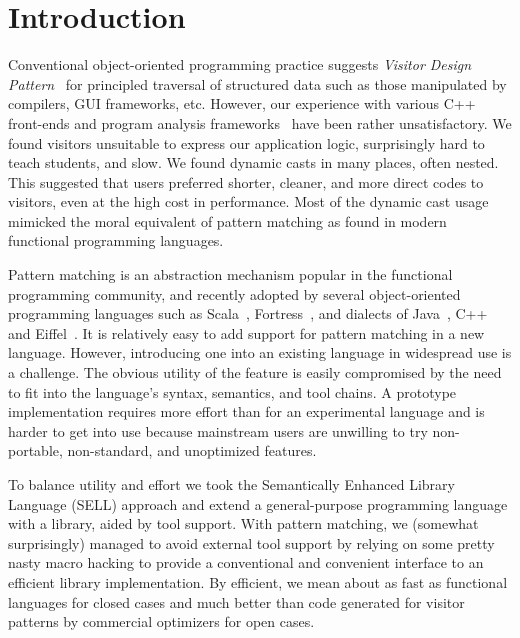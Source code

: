 \documentclass{llncs}
\begin{document}
\section{Introduction} %
\label{sec:intro}

Conventional object-oriented programming practice suggests \emph{Visitor Design 
Pattern}~\cite{DesignPatterns} for principled traversal of structured data such 
as those manipulated by compilers, GUI frameworks, etc. However, our experience 
with various C++ front-ends and program analysis frameworks~\cite{Pivot09,Phoenix,Clang} 
have been rather unsatisfactory. We found visitors unsuitable to express our 
application logic, surprisingly hard to teach students, and slow. We found 
dynamic casts in many places, often nested. This suggested that users preferred 
shorter, cleaner, and more direct codes to visitors, even at the high cost in 
performance. Most of the dynamic cast usage mimicked the moral equivalent of 
pattern matching as found in modern functional programming languages.

Pattern matching is an abstraction mechanism popular in the functional
programming community, and recently adopted by several object-oriented
programming languages such as Scala~\cite{Scala2nd}, Fortress~\cite{RPS10},
and dialects of Java~\cite{Odersky97pizzainto,Liu03jmatch:iterable,HydroJ2003}, 
C++\cite{Prop96} and Eiffel~\cite{Moreau:2003}. It is relatively easy to add 
support for pattern matching in a new language. However, introducing one into an
existing language in widespread use is a challenge. The obvious utility of the 
feature is easily compromised by the need to fit into the language's syntax, 
semantics, and tool chains. A prototype implementation requires more effort than 
for an experimental language and is harder to get into use because mainstream 
users are unwilling to try non-portable, non-standard, and unoptimized features. 

To balance utility and effort we took the Semantically 
Enhanced Library Language (SELL) approach\cite{SELL} and extend a
general-purpose programming language with a library, aided by tool 
support. With pattern matching, we (somewhat surprisingly) managed to avoid 
external tool support by relying on some pretty nasty macro hacking to provide a
conventional and convenient interface to an efficient library implementation.
By efficient, we mean about as fast as functional languages for closed cases and
much better than code generated for visitor patterns by commercial optimizers 
for open cases\cite{TypeSwitch}.
\end{document}

